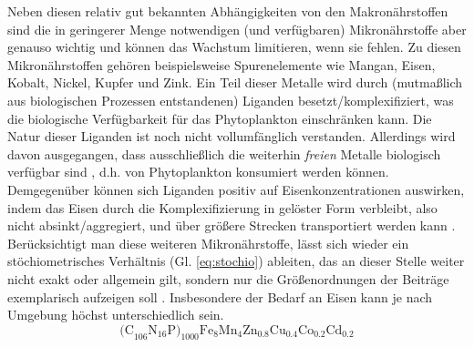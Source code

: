 \documentclass[12pt,a4paper,onecolumn]{scrartcl}
\begin{document}
Neben diesen relativ gut bekannten Abhängigkeiten von den Makronährstoffen sind die in geringerer Menge notwendigen (und verfügbaren) Mikronährstoffe aber genauso wichtig und können das Wachstum limitieren, wenn sie fehlen. Zu diesen Mikronährstoffen gehören beispielsweise Spurenelemente wie Mangan, Eisen, Kobalt, Nickel, Kupfer und Zink. Ein Teil dieser Metalle wird durch (mutmaßlich aus biologischen Prozessen entstandenen) Liganden besetzt/komplexifiziert, was die biologische Verfügbarkeit für das Phytoplankton einschränken kann. Die Natur dieser Liganden ist noch nicht vollumfänglich verstanden. Allerdings wird davon ausgegangen, dass ausschließlich die weiterhin \textit{freien} Metalle biologisch verfügbar sind \citep{Emerson.2009}, d.h. von Phytoplankton konsumiert werden können. Demgegenüber können sich Liganden positiv auf Eisenkonzentrationen auswirken, indem das Eisen durch die Komplexifizierung in gelöster Form verbleibt, also nicht absinkt/aggregiert, und über größere Strecken transportiert werden kann \citep{Tagliabue.2017}. Berücksichtigt man diese weiteren Mikronährstoffe, lässt sich wieder ein stöchiometrisches Verhältnis (Gl. \ref{eq:stochio}) ableiten, das an dieser Stelle weiter nicht exakt oder allgemein gilt, sondern nur die Größenordnungen der Beiträge exemplarisch aufzeigen soll \citep{Emerson.2009}. Insbesondere der Bedarf an Eisen kann je nach Umgebung höchst unterschiedlich sein.
\begin{equation}
\text{(C}_{106} \text{N}_{16} \text{P)}_{1000} \text{Fe}_8\text{Mn}_4\text{Zn}_{0.8}\text{Cu}_{0.4}\text{Co}_{0.2} \text{Cd}_{0.2} \label{eq:stochio}
\end{equation}
\end{document}
